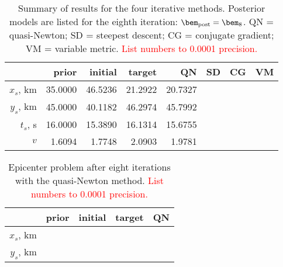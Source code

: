 \documentclass[11pt,titlepage,fleqn]{article}
\begin{document}





\vspace{4cm}

\begin{table}[h]
\centering
\caption[]{
Summary of results for the four iterative methods.
Posterior models are listed for the eighth iteration: $\bem_{\rm post} = \bem_8$.
QN = quasi-Newton; SD = steepest descent; CG = conjugate gradient; VM = variable metric.
\textcolor{red}{List numbers to 0.0001 precision.}
\label{tab}
}
\begin{spacing}{1.4}
\begin{tabular}{r||r|r|r||r|r|r|r}
\hline
& prior & initial & target & QN & SD \hspace{1cm} & CG \hspace{1cm}  & VM \hspace{1cm}  \\
\hline\hline 
$x_s$, km & 35.0000 & 46.5236 & 21.2922 & 20.7327 & & \\ \hline
$y_s$, km & 45.0000 & 40.1182 & 46.2974 & 45.7992 & & \\ \hline
$t_s$, s  & 16.0000 & 15.3890 & 16.1314 & 15.6755 & & \\ \hline
$v$       &  1.6094 &  1.7748 &  2.0903 &  1.9781 & & \\ \hline
\end{tabular}
\end{spacing}
\end{table}

\begin{table}
\centering
\caption[]{
Epicenter problem after eight iterations with the quasi-Newton method.
\textcolor{red}{List numbers to 0.0001 precision.}
\label{tab:epi}
}
\begin{spacing}{1.4}
\begin{tabular}{r||r|r|r||r}
\hline
& prior & initial & target & QN \\
\hline\hline 
$x_s$, km & \hspace{2cm} & \hspace{2cm} & \hspace{2cm} & \hspace{2cm} \\ \hline
$y_s$, km & & & &  \\ \hline
\end{tabular}
\end{spacing}
\end{table}
\end{document}
